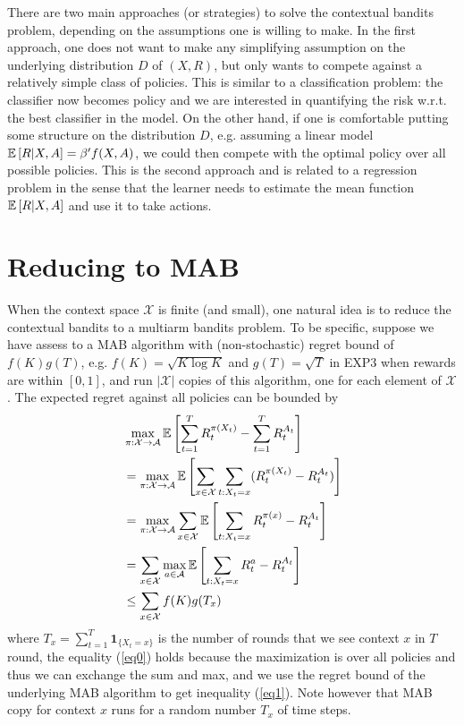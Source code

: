 \documentclass[11pt]{article}
\begin{document}
There are two main approaches (or strategies)  to solve the contextual bandits problem, depending on the assumptions one is willing to make.     In the first approach, one does not want to make any simplifying assumption on the underlying  distribution $D$ of $(X, R)$, but only wants to compete against a relatively simple class of policies.  This is similar to a classification problem: the classifier now becomes policy and we are interested in quantifying the  risk w.r.t.  the best classifier in the model.    On the other hand, if one is comfortable putting some structure on the distribution $D$, e.g. assuming a linear model $\mathbb{E}\left[ R|X, A \right] = \beta'f(X, A)$, we could then compete with the optimal policy over all possible policies.   This is the second approach  and is related to a regression problem in the sense that the learner needs to estimate the mean function $\mathbb{E}\left[ R|X, A \right]$ and use it to take actions. 





\section{Reducing to  MAB}

When the context space $\mathcal{X}$ is finite (and small), one natural idea is to reduce the contextual bandits to a multiarm bandits problem. To be specific, suppose we have assess to a MAB algorithm with (non-stochastic) regret bound of $f(K) g(T)$, e.g. $f(K) = \sqrt{K\log K}$ and $g(T) = \sqrt{T}$ in EXP3 when rewards are within $[0, 1]$,  and run $|\mathcal{X}|$ copies of this algorithm, one for each element of $\mathcal{X}$. The expected regret against all policies can be bounded by
\begin{align}
& \max_{\pi: \mathcal{X} \rightarrow \mathcal{A}} \mathbb{E}\left[  \sum_{t=1}^{T} R_{t}^{\pi(X_t)} - \sum_{t=1}^{T} R_t^{A_t}   \right] \notag\\
& = \max_{\pi: \mathcal{X} \rightarrow \mathcal{A}} \mathbb{E}\left[  \sum_{x \in \mathcal{X}} \sum_{t: X_t = x} (R_{t}^{\pi(X_t)} - R_t^{A_t})   \right] \notag\\
& = \max_{\pi: \mathcal{X} \rightarrow \mathcal{A}} \sum_{x \in \mathcal{X}} \mathbb{E}\left[   \sum_{t: X_t = x} R_{t}^{\pi(x)} - R_t^{A_t}   \right]\notag\\
& = \sum_{x \in \mathcal{X}} \max_{a \in \mathcal{A}}\mathbb{E}\left[   \sum_{t: X_t = x} R_{t}^{a} - R_t^{A_t}   \right]\label{eq0}\\
& \leq \sum_{x \in \mathcal{X}} f(K) g(T_x)   \label{eq1}
\end{align}
where $T_x = \sum_{t=1}^{T} \mathbf{1}_{\{X_t = x\}}$ is the number of rounds that we see context $x$ in $T$ round, the equality (\ref{eq0}) holds because the maximization is over all policies and thus we can exchange the sum and max, and we use the regret bound of the underlying MAB algorithm to get inequality (\ref{eq1}). Note however that MAB copy for context $x$ runs for a random number $T_x$ of time steps.
\end{document}
